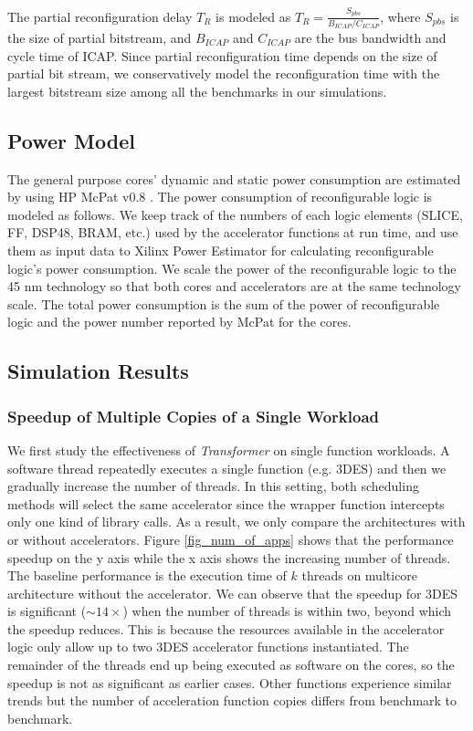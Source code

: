 The partial reconfiguration delay $T_R$ is modeled as $ T_R = \frac{S_{pbs}}{ B_{ICAP} / C_{ICAP}} $,
where $S_{pbs}$ is the size of
partial bitstream, and $B_{ICAP}$ and $C_{ICAP}$ are the bus bandwidth
and cycle time of ICAP.
Since partial reconfiguration time depends on the size of partial bit
stream, we conservatively model the reconfiguration time with the
largest bitstream size among all the benchmarks in our simulations. 


\subsection{Power Model}
The general purpose cores' dynamic and static power consumption are
estimated by using HP McPat v0.8 \cite{mcpat}. The power consumption of reconfigurable logic
is modeled as follows. We keep track of the numbers of
each logic elements (SLICE, FF, DSP48, BRAM, etc.) used by the
accelerator functions at run time, and use them as input data to Xilinx Power Estimator
\cite{xpe} for calculating reconfigurable logic's power consumption.  
We scale the power of the reconfigurable logic to the 45 nm technology
so that both cores and accelerators are at the same technology
scale. The total power consumption is the sum of the power of
reconfigurable logic  and  the power number reported by McPat for the
cores. 


\subsection{Simulation Results}
\label{sec_simu_result}

\subsubsection{Speedup of Multiple Copies of a Single Workload}

We first study the effectiveness of {\em Transformer} on single function 
workloads. A software thread repeatedly executes a single function
(e.g. 3DES) and then we gradually increase the number of threads. In this setting, both 
scheduling methods will select the same accelerator since the wrapper function
intercepts only one kind of library calls. As a result, we only compare the architectures with
or without accelerators. 
Figure \ref{fig_num_of_apps} shows that the performance speedup on the y
axis while the x axis shows the increasing number of threads. The
baseline performance is the execution time of $k$ threads on multicore
architecture without the accelerator. We can
observe that the speedup for 3DES is significant ($\sim14\times$) when the number of threads is
within two, beyond which the speedup reduces. This is because the
resources available in the accelerator logic only allow up to two
3DES accelerator functions instantiated. The remainder of the threads
end up being executed as software on the cores, so the speedup is not
as significant as earlier cases.  Other functions
experience similar trends but the number of acceleration function
copies differs from benchmark to benchmark.   

